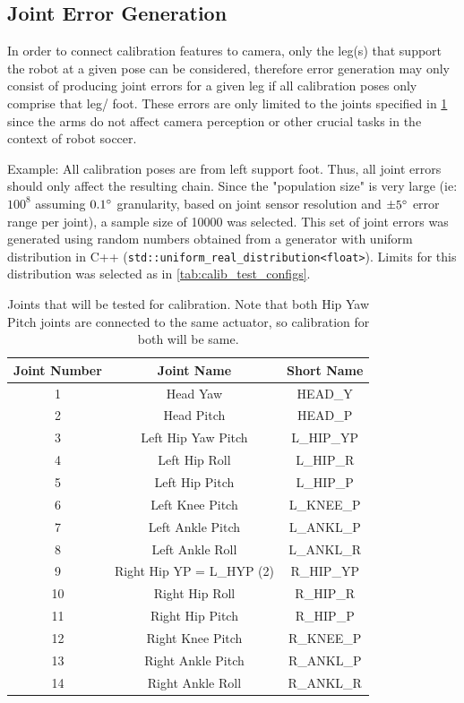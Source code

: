 \documentclass[english, printversion, nomenclature, notitle]{tuvisionthesis} %
\begin{document}
\subsection{Joint Error Generation}
In order to connect calibration features to camera, only the leg(s) that support the robot at a given pose can be considered, therefore error generation may only consist of producing joint errors for a given leg if all calibration poses only comprise that leg/ foot. These errors are only limited to the joints specified in \cref{tab:joints_calibrated} since the arms do not affect camera perception or other crucial tasks in the context of robot soccer.

Example: All calibration poses are from left support foot. Thus, all joint errors should only affect the resulting chain. Since the "population size" is very large (ie: $100^8$ assuming $0.1\degree$ granularity, based on joint sensor resolution and $\pm5\degree$ error range per joint), a sample size of 10000 was selected. This set of joint errors was generated using random numbers obtained from a generator with uniform distribution in C++ (\lstinline{std::uniform_real_distribution<float>}). Limits for this distribution was selected as in \cref{tab:calib_test_configs}.

\begin{table}[]
	\centering
	\begin{tabular}{@{}c|cc@{}}
		\toprule
		\textbf{Joint Number} & \textbf{Joint Name} & \textbf{Short Name} \\ \midrule
		1 & Head Yaw & HEAD\_Y \\
		2 & Head Pitch & HEAD\_P\\
		3 & Left Hip Yaw Pitch & L\_HIP\_YP\\
		4 & Left Hip Roll & L\_HIP\_R\\
		5 & Left Hip Pitch & L\_HIP\_P\\
		6 & Left Knee Pitch & L\_KNEE\_P\\
		7 & Left Ankle Pitch & L\_ANKL\_P\\
		8 & Left Ankle Roll & L\_ANKL\_R\\
		9 & Right Hip YP = L\_HYP (2) & R\_HIP\_YP\\
		10 & Right Hip Roll & R\_HIP\_R\\
		11 & Right Hip Pitch & R\_HIP\_P\\
		12 & Right Knee Pitch & R\_KNEE\_P\\
		13 & Right Ankle Pitch & R\_ANKL\_P\\
		14 & Right Ankle Roll & R\_ANKL\_R\\
		\bottomrule
	\end{tabular}
	\caption{Joints that will be tested for calibration. Note that both Hip Yaw Pitch joints are connected to the same actuator, so calibration for both will be same.}
	\label{tab:joints_calibrated}
\end{table}
\end{document}
